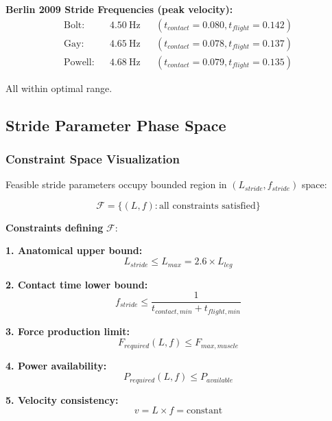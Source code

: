\textbf{Berlin 2009 Stride Frequencies (peak velocity):}
\begin{align}
\text{Bolt:} && 4.50~\text{Hz} && (t_{contact}=0.080, t_{flight}=0.142) \\
\text{Gay:} && 4.65~\text{Hz} && (t_{contact}=0.078, t_{flight}=0.137) \\
\text{Powell:} && 4.68~\text{Hz} && (t_{contact}=0.079, t_{flight}=0.135)
\end{align}

All within optimal range.

\subsection{Stride Parameter Phase Space}

\subsubsection{Constraint Space Visualization}

Feasible stride parameters occupy bounded region in $(L_{stride}, f_{stride})$ space:

\begin{equation}
\mathcal{F} = \{(L, f) : \text{all constraints satisfied}\}
\label{eq:feasible_region}
\end{equation}

\textbf{Constraints defining} $\mathcal{F}$:

\textbf{1. Anatomical upper bound:}
\begin{equation}
L_{stride} \leq L_{max} = 2.6 \times L_{leg}
\label{eq:length_upper}
\end{equation}

\textbf{2. Contact time lower bound:}
\begin{equation}
f_{stride} \leq \frac{1}{t_{contact,min} + t_{flight,min}}
\label{eq:frequency_upper}
\end{equation}

\textbf{3. Force production limit:}
\begin{equation}
F_{required}(L, f) \leq F_{max,muscle}
\label{eq:force_limit}
\end{equation}

\textbf{4. Power availability:}
\begin{equation}
P_{required}(L, f) \leq P_{available}
\label{eq:power_limit}
\end{equation}

\textbf{5. Velocity consistency:}
\begin{equation}
v = L \times f = \text{constant}
\label{eq:velocity_consistency}
\end{equation}

